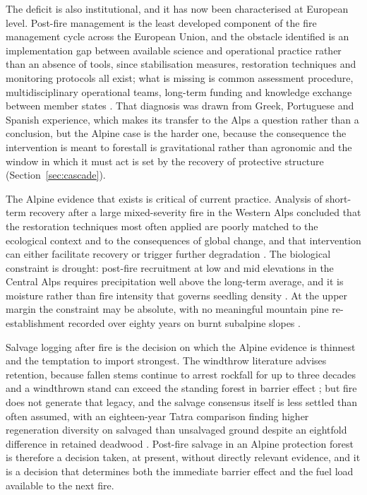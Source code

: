 \documentclass[11pt,a4paper]{article}
\begin{document}
The deficit is also institutional, and it has now been characterised at European level. Post-fire management is the least developed component of the fire management cycle across the European Union, and the obstacle identified is an implementation gap between available science and operational practice rather than an absence of tools, since stabilisation measures, restoration techniques and monitoring protocols all exist; what is missing is common assessment procedure, multidisciplinary operational teams, long-term funding and knowledge exchange between member states \citep{vieira_postfire_2026}. That diagnosis was drawn from Greek, Portuguese and Spanish experience, which makes its transfer to the Alps a question rather than a conclusion, but the Alpine case is the harder one, because the consequence the intervention is meant to forestall is gravitational rather than agronomic and the window in which it must act is set by the recovery of protective structure (Section~\ref{sec:cascade}).

The Alpine evidence that exists is critical of current practice. Analysis of short-term recovery after a large mixed-severity fire in the Western Alps concluded that the restoration techniques most often applied are poorly matched to the ecological context and to the consequences of global change, and that intervention can either facilitate recovery or trigger further degradation \citep{mantero_short-term_2023}. The biological constraint is drought: post-fire recruitment at low and mid elevations in the Central Alps requires precipitation well above the long-term average, and it is moisture rather than fire intensity that governs seedling density \citep{moser_potential_2010}. At the upper margin the constraint may be absolute, with no meaningful mountain pine re-establishment recorded over eighty years on burnt subalpine slopes \citep{degiuli_arrested_2024}.

Salvage logging after fire is the decision on which the Alpine evidence is thinnest and the temptation to import strongest. The windthrow literature advises retention, because fallen stems continue to arrest rockfall for up to three decades and a windthrown stand can exceed the standing forest in barrier effect \citep{costa_biological_2021}; but fire does not generate that legacy, and the salvage consensus itself is less settled than often assumed, with an eighteen-year Tatra comparison finding higher regeneration diversity on salvaged than unsalvaged ground despite an eightfold difference in retained deadwood \citep{seben_impact_2024}. Post-fire salvage in an Alpine protection forest is therefore a decision taken, at present, without directly relevant evidence, and it is a decision that determines both the immediate barrier effect and the fuel load available to the next fire.
\end{document}
